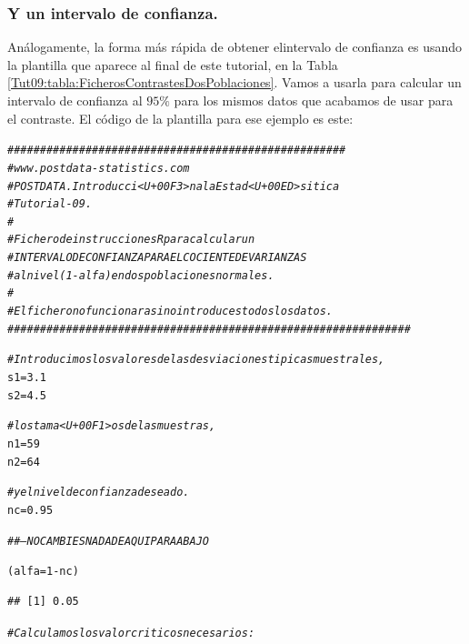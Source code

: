\documentclass[10pt,a4paper]{article}\usepackage[]{graphicx}\usepackage[]{color}
\makeatletter
\newcommand{\hlnum}[1]{\textcolor[rgb]{0.686,0.059,0.569}{#1}}%
\newcommand{\hlcom}[1]{\textcolor[rgb]{0.678,0.584,0.686}{\textit{#1}}}%
\newcommand{\hlopt}[1]{\textcolor[rgb]{0,0,0}{#1}}%
\newcommand{\hlstd}[1]{\textcolor[rgb]{0.345,0.345,0.345}{#1}}%
\newcommand{\hlkwb}[1]{\textcolor[rgb]{0.69,0.353,0.396}{#1}}%
\newenvironment{kframe}{%
 \def\at@end@of@kframe{}%
 \ifinner\ifhmode%
  \def\at@end@of@kframe{\end{minipage}}%
  \begin{minipage}{\columnwidth}%
 \fi\fi%
 \def\FrameCommand##1{\hskip\@totalleftmargin \hskip-\fboxsep
 \colorbox{shadecolor}{##1}\hskip-\fboxsep
     \hskip-\linewidth \hskip-\@totalleftmargin \hskip\columnwidth}%
 \MakeFramed {\advance\hsize-\width
   \@totalleftmargin\z@ \linewidth\hsize
   \@setminipage}}%
 {\par\unskip\endMakeFramed%
 \at@end@of@kframe}
\newenvironment{knitrout}{}{} %
\newcounter {cont01}
\makeatother
\begin{document}
\subsubsection*{Y un intervalo de confianza.}

Análogamente, la forma más rápida de obtener elintervalo de confianza es usando la plantilla que aparece al final de este tutorial, en la Tabla \ref{Tut09:tabla:FicherosContrastesDosPoblaciones}. Vamos a usarla para calcular un intervalo de confianza al $95\%$ para los mismos datos que acabamos de usar para el contraste. El código de la plantilla para ese ejemplo es este:

\begin{knitrout}
\color{fgcolor}\begin{kframe}
\begin{alltt}
\hlcom{####################################################}
\hlcom{# www.postdata-statistics.com}
\hlcom{# POSTDATA. Introducci<U+00F3>n a la Estad<U+00ED>sitica}
\hlcom{# Tutorial-09.}
\hlcom{#}
\hlcom{# Fichero de instrucciones R para calcular un}
\hlcom{# INTERVALO DE CONFIANZA PARA EL COCIENTE DE VARIANZAS}
\hlcom{# al nivel (1-alfa)   en dos poblaciones normales.}
\hlcom{#}
\hlcom{# El fichero no funcionara si no introduces todos los datos.}
\hlcom{##############################################################}


\hlcom{# Introducimos los valores de las desviaciones tipicas muestrales,}
\hlstd{s1} \hlkwb{=} \hlnum{3.1}
\hlstd{s2} \hlkwb{=} \hlnum{4.5}


\hlcom{# los tama<U+00F1>os de las muestras,}
\hlstd{n1} \hlkwb{=} \hlnum{59}
\hlstd{n2} \hlkwb{=} \hlnum{64}

\hlcom{# y el nivel de confianza deseado.}
\hlstd{nc} \hlkwb{=} \hlnum{0.95}

\hlcom{## --- NO CAMBIES NADA DE AQUI PARA ABAJO}

\hlstd{(alfa} \hlkwb{=} \hlnum{1} \hlopt{-} \hlstd{nc)}
\end{alltt}
\begin{verbatim}
## [1] 0.05
\end{verbatim}
\begin{alltt}
\hlcom{# Calculamos los valor criticos necesarios:}


\end{alltt}
\end{kframe}
\end{knitrout}
\end{document}
